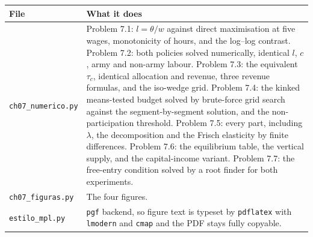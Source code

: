 \documentclass[12pt, letterpaper]{article}
\begin{document}
\begin{center}
\begin{tabular}{@{}lp{10.2cm}@{}}
\toprule
\textbf{File} & \textbf{What it does} \\
\midrule
\texttt{ch07\_numerico.py} & Problem 7.1: $l=\theta/w$ against direct maximisation at five
wages, monotonicity of hours, and the log--log contrast. Problem 7.2: both policies solved
numerically, identical $l$, $c$, army and non-army labour. Problem 7.3: the equivalent
$\tau_c$, identical allocation and revenue, three revenue formulas, and the iso-wedge grid.
Problem 7.4: the kinked means-tested budget solved by brute-force grid search against the
segment-by-segment solution, and the non-participation threshold. Problem 7.5: every part,
including $\lambda$, the decomposition and the Frisch elasticity by finite differences.
Problem 7.6: the equilibrium table, the vertical supply, and the capital-income variant.
Problem 7.7: the free-entry condition solved by a root finder for both experiments. \\
\texttt{ch07\_figuras.py} & The four figures. \\
\texttt{estilo\_mpl.py} & \texttt{pgf} backend, so figure text is typeset by \texttt{pdflatex}
with \texttt{lmodern} and \texttt{cmap} and the PDF stays fully copyable. \\
\bottomrule
\end{tabular}
\end{center}
\end{document}
